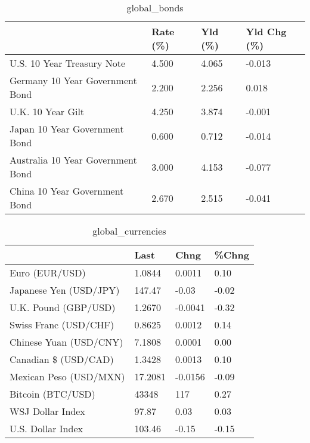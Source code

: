 \documentclass{article}%
\begin{document}
%


\begin{table}[htbp]%
\caption{global\_bonds}%
\centering%
\begin{adjustbox}{width=1\textwidth}%
\begin{tabular}{llll}
\toprule
                                  & Rate (\%) & Yld (\%) & Yld Chg (\%) \\
\midrule
       U.S. 10 Year Treasury Note &    4.500 &   4.065 &      -0.013 \\
  Germany 10 Year Government Bond &    2.200 &   2.256 &       0.018 \\
                U.K. 10 Year Gilt &    4.250 &   3.874 &      -0.001 \\
    Japan 10 Year Government Bond &    0.600 &   0.712 &      -0.014 \\
Australia 10 Year Government Bond &    3.000 &   4.153 &      -0.077 \\
    China 10 Year Government Bond &    2.670 &   2.515 &      -0.041 \\
\bottomrule
\end{tabular}
%
\end{adjustbox}%
\end{table}

%


\begin{table}[htbp]%
\caption{global\_currencies}%
\centering%
\begin{adjustbox}{width=1\textwidth}%
\begin{tabular}{llll}
\toprule
                       &    Last &    Chng & \%Chng \\
\midrule
        Euro (EUR/USD) &  1.0844 &  0.0011 &  0.10 \\
Japanese Yen (USD/JPY) &  147.47 &   -0.03 & -0.02 \\
  U.K. Pound (GBP/USD) &  1.2670 & -0.0041 & -0.32 \\
 Swiss Franc (USD/CHF) &  0.8625 &  0.0012 &  0.14 \\
Chinese Yuan (USD/CNY) &  7.1808 &  0.0001 &  0.00 \\
  Canadian \$ (USD/CAD) &  1.3428 &  0.0013 &  0.10 \\
Mexican Peso (USD/MXN) & 17.2081 & -0.0156 & -0.09 \\
     Bitcoin (BTC/USD) &   43348 &     117 &  0.27 \\
      WSJ Dollar Index &   97.87 &    0.03 &  0.03 \\
     U.S. Dollar Index &  103.46 &   -0.15 & -0.15 \\
\bottomrule
\end{tabular}
%
\end{adjustbox}%
\end{table}
\end{document}
